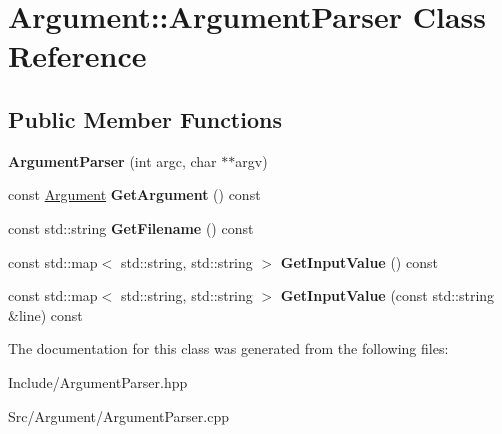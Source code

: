 \hypertarget{classArgument_1_1ArgumentParser}{}\section{Argument\+:\+:Argument\+Parser Class Reference}
\label{classArgument_1_1ArgumentParser}
\subsection*{Public Member Functions}
\begin{DoxyCompactItemize}
\item 
\mbox{\label{classArgument_1_1ArgumentParser_aa4c2872c305ced9d612c28dbb56414a8}} 
{\bfseries Argument\+Parser} (int argc, char $\ast$$\ast$argv)
\item 
\mbox{\label{classArgument_1_1ArgumentParser_a1da4d911f8f24fe5e56e05cc6ecacb2a}} 
const \mbox{\hyperlink{structArgument_1_1Argument}{Argument}} {\bfseries Get\+Argument} () const
\item 
\mbox{\label{classArgument_1_1ArgumentParser_ac50d13b91ca998eae1bb82761d766e01}} 
const std\+::string {\bfseries Get\+Filename} () const
\item 
\mbox{\label{classArgument_1_1ArgumentParser_a2cbf85091fc3efd5af7534beb25ab40c}} 
const std\+::map$<$ std\+::string, std\+::string $>$ {\bfseries Get\+Input\+Value} () const
\item 
\mbox{\label{classArgument_1_1ArgumentParser_af261af17ad59a8fb7c2618e5a25b5122}} 
const std\+::map$<$ std\+::string, std\+::string $>$ {\bfseries Get\+Input\+Value} (const std\+::string \&line) const
\end{DoxyCompactItemize}


The documentation for this class was generated from the following files\+:\begin{DoxyCompactItemize}
\item 
Include/Argument\+Parser.\+hpp\item 
Src/\+Argument/Argument\+Parser.\+cpp\end{DoxyCompactItemize}
